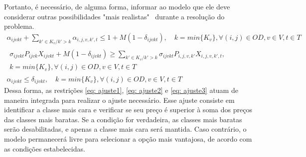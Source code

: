 Portanto, é necessário, de alguma forma, informar ao modelo que ele deve considerar outras possibilidades "mais realistas" \, durante a resolução do problema.
\begin{gather}
	\alpha_{ijvkt} +  \sum_{k' \in K_v / k'>k}  \alpha_{i,j,v,k',t}  \leq 1+M(1-\delta_{ijvkt}), \quad   k = min\{K_v\}, \forall(i,j) \in OD, v \in V, t \in T  \label{eq: ajuste1} \\
	\begin{split}
		\sigma_{ijvkt} P_{ijvk}X_{ijvkt} + M(1-\delta_{ijvkt})   \geq \sum_{k' \in K_v / k'>k} \sigma_{ijvkt} P_{i,j,v,k'}X_{i,j,v,k',t}, \\  k = min\{K_v\}, \forall(i,j) \in OD, v \in V, t \in T  \label{eq: ajuste2}
	\end{split} \\
	\alpha_{ijvkt} \leq \delta_{ijvkt}, \quad   k = min\{K_v\}, \forall(i,j) \in OD, v \in V, t \in T   \label{eq: ajuste3}
\end{gather}
Dessa forma, as restrições  \eqref{eq: ajuste1},  \eqref{eq: ajuste2} e  \eqref{eq: ajuste3} atuam de maneira integrada para realizar o ajuste necessário. Esse ajuste consiste em identificar a classe mais cara e verificar se seu preço é superior à soma dos preços das classes mais baratas. Se a condição for verdadeira, as classes mais baratas serão desabilitadas, e apenas a classe mais cara será mantida. Caso contrário, o modelo permanecerá livre para selecionar a opção mais vantajosa, de acordo com as condições estabelecidas.

